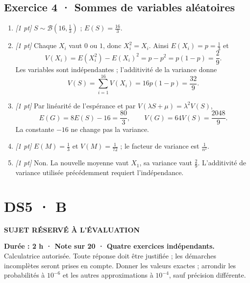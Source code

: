 \subsection*{Exercice 4 · Sommes de variables aléatoires}\begin{enumerate}

\item \textit{[1 pt]} $S\sim\mathcal B(16,\frac{1}{3})$ ; $E(S)=\frac{16}{3}$.

\item \textit{[1 pt]} Chaque $X_i$ vaut $0$ ou $1$, donc $X_i^2=X_i$. Ainsi $E(X_i)=p=\frac{1}{3}$ et
\[V(X_i)=E(X_i^2)-E(X_i)^2=p-p^2=p(1-p)=\frac{2}{9}.\]
Les variables sont indépendantes ; l'additivité de la variance donne
\[V(S)=\sum_{i=1}^{16}V(X_i)=16p(1-p)=\frac{32}{9}.\]

\item \textit{[1 pt]} Par linéarité de l'espérance et par $V(\lambda S+\mu)=\lambda^2V(S)$,
\[E(G)=8E(S)-16=\frac{80}{3},\qquad V(G)=64V(S)=\frac{2048}{9}.\]
La constante $-16$ ne change pas la variance.

\item \textit{[1 pt]} $E(M)=\frac{1}{3}$ et $V(M)=\frac{1}{72}$ ; le facteur de variance est $\frac{1}{n^2}$.

\item \textit{[1 pt]} Non. La nouvelle moyenne vaut $X_1$, sa variance vaut $\frac{2}{9}$. L'additivité de variance utilisée précédemment requiert l'indépendance.

\end{enumerate}

\fi

\fi

\ifprof

\clearpage{}\label{sujet:7-4}

\section*{DS5 · B}

{\sffamily\bfseries\color{amber}SUJET RÉSERVÉ À L'ÉVALUATION\par}

\textbf{Durée : 2 h · Note sur 20 · Quatre exercices indépendants.}\\Calculatrice autorisée. Toute réponse doit être justifiée ; les démarches incomplètes seront prises en compte. Donner les valeurs exactes ; arrondir les probabilités à $10^{-6}$ et les autres approximations à $10^{-4}$, sauf précision différente.

